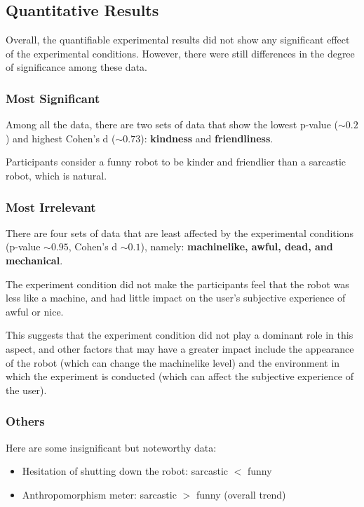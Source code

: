 \documentclass[conference]{IEEEtran}
\begin{document}
\subsection{Quantitative Results}

Overall, the quantifiable experimental results did not show any significant effect of the experimental conditions. However, there were still differences in the degree of significance among these data.

\subsubsection{Most Significant}

Among all the data, there are two sets of data that show the lowest p-value ($\sim0.2$) and highest Cohen's d ($\sim0.73$):  \textbf{kindness} and \textbf{friendliness}. 

Participants consider a funny robot to be kinder and friendlier than a sarcastic robot, which is natural.

\subsubsection{Most Irrelevant}

There are four sets of data that are least affected by the experimental conditions (p-value $\sim0.95$, Cohen's d $\sim0.1$), namely: \textbf{machinelike, awful, dead, and mechanical}.

The experiment condition did not make the participants feel that the robot was less like a machine, and had little impact on the user's subjective experience of awful or nice.

This suggests that the experiment condition did not play a dominant role in this aspect, and other factors that may have a greater impact include the appearance of the robot (which can change the machinelike level) and the environment in which the experiment is conducted (which can affect the subjective experience of the user).

\subsubsection{Others}


Here are some insignificant but noteworthy data:

\begin{itemize}
    \item Hesitation of shutting down the robot: sarcastic $<$ funny 
    \item Anthropomorphism meter: sarcastic $>$ funny (overall trend)
\end{itemize}
\end{document}
